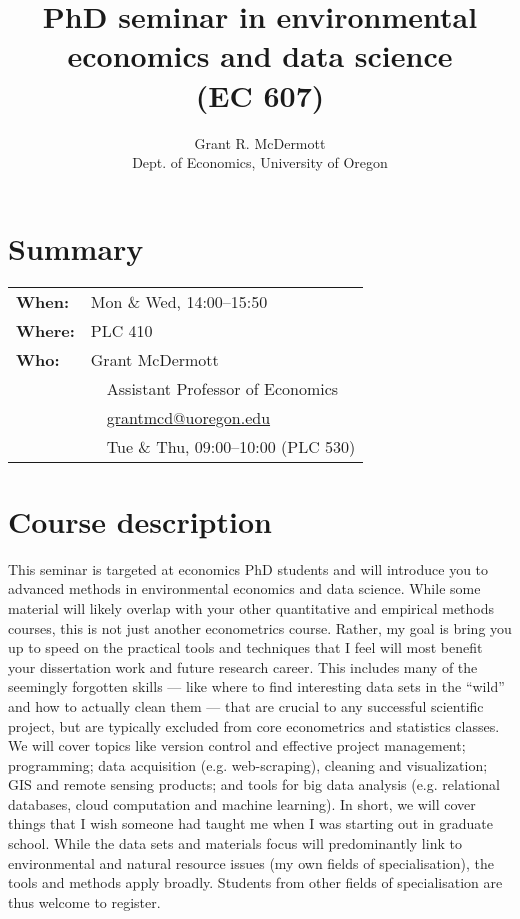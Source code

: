 \documentclass[12]{article}
\newcommand{\subtitle}[1]{%
	\posttitle{%
		\par\end{center}
	\begin{center}\large#1\end{center}
	\vskip0.5em}%
}
\begin{document}
\title{PhD seminar in environmental economics and data science\\(EC 607)}
\subtitle{\textsc{Winter 2019 syllabus}\vspace{-2ex}}
\author{Grant R. McDermott\\ Dept. of Economics, University of Oregon}
\date{\vspace{-5ex}}
	
\maketitle

\section*{Summary}

\begin{tabular}{ll} 
	\textbf{When:} & Mon \& Wed, 14:00--15:50\\
	\textbf{Where:} & PLC 410\\
	\textbf{Who:} & Grant McDermott \\
	& \, \faMortarBoard \, Assistant Professor of Economics \\
	& \, \faEnvelopeO \, \href{mailto:grantmcd@uoregon.edu}{grantmcd@uoregon.edu} \\
	& \, \faHourglassHalf \, Tue \& Thu, 09:00--10:00 (PLC 530)
\end{tabular} 

\section*{Course description}

This seminar is targeted at economics PhD students and will introduce you to advanced methods in environmental economics and data science. While some material will likely overlap with your other quantitative and empirical methods courses, this is not just another econometrics course. Rather, my goal is bring you up to speed on the practical tools and techniques that I feel will most benefit your dissertation work and future research career. This includes many of the seemingly forgotten skills --- like where to find interesting data sets in the ``wild'' and how to actually clean them --- that are crucial to any successful scientific project, but are typically excluded from core econometrics and statistics classes. We will cover topics like version control and effective project management; programming; data acquisition (e.g. web-scraping), cleaning and visualization; GIS and remote sensing products; and tools for big data analysis (e.g. relational databases, cloud computation and machine learning). In short, we will cover things that I wish someone had taught me when I was starting out in graduate school. While the data sets and materials focus will predominantly link to environmental and natural resource issues (my own fields of specialisation), the tools and methods apply broadly. Students from other fields of specialisation are thus welcome to register.
\end{document}
